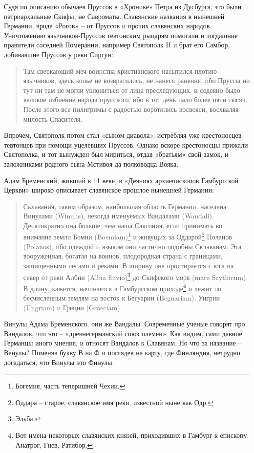 Судя по описанию обычаев Пруссов в «Хронике» Петра из Дусбурга, это были патриархальные Скифы, не Савроматы. Славянские названия в нынешней Германии, вроде «Рогов» – от Пруссов и прочих славянских народов. Уничтожению язычников-Пруссов тевтонским рыцарям помогали и тогдашние правители соседней Померании, например Святополк II и брат его Самбор, добивавшие Пруссов у реки Сиргун\cite{petrdusburg}: 

\begin{quotation}
Там сверкающий меч воинства христианского насытился плотию язычников, здесь копье не возвратилось, не нанеся ранения, ибо Пруссы ни тут ни там не могли уклониться от лица преследующих, и содеяно было великое избиение народа прусского, ибо в тот день пало более пяти тысяч. После этого все пилигримы с радостью воротились восвояси, восхваляя милость Спасителя.
\end{quotation}

Впрочем, Святополк потом стал «сыном диавола», истребляя уже крестоносцев-тевтонцев при помощи уцелевших Пруссов. Однако вскоре крестоносцы прижали Святополка, и тот вынужден был мириться, отдав «братьям» свой замок, и заложниками родного сына Мстивоя да полководца Вояка.

Адам Бременский, живший в 11 веке, в «Деяниях архиепископов Гамбургской Церкви» широко описывает славянское прошлое нынешней Германии\cite{adambrem}:

\begin{quotation}
Склавания, таким образом, наибольшая область Германии, населена Винулами (Winulis), некогда именуемых Вандалами (Wandali). Десятикратно она больше, чем наша Саксония, если принимать во внимание земли Бомии (Boem\-iam)\footnote{Богемия, часть теперишней Чехии.} и живущих за Оддарой\footnote{Оддара – старое, славянское имя реки, известной ныне как Одр.} Поланов (Polan\-os), ибо одеждой и языком они частично подобны Склаванам. Эта вооруженная, богатая на воинов, плодородная страна с границами, защищенными лесами и реками. В ширину она простирается с юга на север от реки Албии (Albia fluvio)\footnote{Эльба.} до Скифского моря (mare Scythicum). В длину, кажется, начинается в Гамбургском приходе\footnote{Вот имена некоторых славянских князей, приходивших в Гамбург к епископу: Анатрог, Гнев, Ратибор.} и лежит по бесчисленным землям на восток к Бегуарии (Beguariam), Унгрии (Ungri\-am) и Греции (Graeciam).
\end{quotation}

Винулы Адама Бременского, они же Вандалы. Современные ученые говорят про Вандалов, что это – «древнегерманский союз племен». Как видим, сами давние Германцы иного мнения, и относят Вандалов к Славянам. Но что за название – Венулы? Поменяв букву В на Ф и поглядев на карту, где Финляндия, нетрудно догадаться, что Винулы это Финулы.

